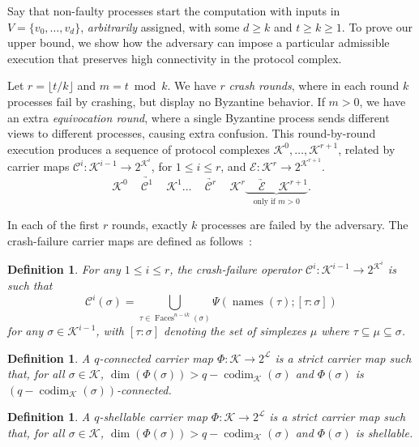 \documentclass[11pt]{article}
\newcommand{\cC}{\ensuremath{\mathcal{C}}}
\newcommand{\cE}{\ensuremath{\mathcal{E}}}
\newcommand{\cK}{\ensuremath{\mathcal{K}}}
\newcommand{\cL}{\ensuremath{\mathcal{L}}}
\DeclareMathOperator{\Faces}{Faces}
\DeclareMathOperator{\codim}{codim}
\DeclareMathOperator{\names}{names}\DeclareMathOperator{\name}{name}\DeclareMathOperator{\sgn}{sgn}
\newtheorem{definition}[theorem]{Definition}
\newcommand{\set}[1]{\{#1\}}
\newcommand{\runmap}[1]{{\, \underrightarrow{\quad {#1} \quad} \,}}
\newcommand{\piece}[2]{[{#1}:{#2}]}
\begin{document}
Say that non-faulty processes start the computation with inputs in $V = \set{v_0, \ldots, v_d}$,
\emph{arbitrarily} assigned,
with some $d \ge k$ and $t \ge k \ge 1$.
To prove our upper bound,
we show how the adversary can impose a particular admissible execution
that preserves high connectivity in the protocol complex.

Let $r = \lfloor t/k \rfloor$ and $m = t \bmod k$.
We have $r$ \emph{crash rounds},
where in each round $k$ processes fail by crashing, but display no Byzantine behavior.
If $m > 0$,
we have an extra \emph{equivocation round},
where a single Byzantine process
sends different views to different processes,
causing extra confusion.
This round-by-round execution produces a sequence of protocol complexes
$\cK^0, \ldots, \cK^{r+1}$,
related by carrier maps
$\cC^i: \cK^{i-1} \to 2^{\cK^i}$,
for $1 \le i \le r$,
and $\cE: \cK^r \to 2^{\cK^{r+1}}$.
\begin{equation}
\label{equation-setting}
\cK^0 \runmap{\cC^1} \cK^1 \ldots \runmap{\cC^r} \cK^r
\underbrace{\runmap{\cE} \cK^{r+1}}_{\textrm{only if $m > 0$}} \mathrm{.}
\end{equation}



In each of the first $r$ rounds,
exactly $k$ processes are failed by the adversary.
The crash-failure carrier maps are defined
as follows~\cite{ConcurrentShellable,MauriceBook}:

\begin{definition}
\label{definition-roundop-crash}
For any $1 \le i \le r$,
the crash-failure operator $\cC^i: \cK^{i-1} \to 2^{\cK^i}$ is such that
\begin{equation}
\label{eq-roundop-crash}
\cC^i(\sigma) = \bigcup_{\tau \in \Faces^{n-ik}(\sigma)}
		\Psi(\names(\tau); \piece{\tau}{\sigma})
\end{equation}
for any $\sigma \in \cK^{i-1}$,
with $\piece{\tau}{\sigma}$ denoting the set of simplexes $\mu$ where $\tau \subseteq \mu \subseteq \sigma$.
\end{definition}

\begin{definition}
\label{definition-mapconnected}
A \emph{$q$-connected} carrier map $\Phi: \cK \to 2^{\cL}$ is
a strict carrier map such that, for all $\sigma \in \cK$,
$\dim(\Phi(\sigma)) > q - \codim_{\cK}(\sigma)$
and
$\Phi(\sigma)$ is $(q - \codim_{\cK}(\sigma))$-connected.
\end{definition}

\begin{definition}
\label{definition-mapshellable}
A \emph{$q$-shellable} carrier map $\Phi: \cK \to 2^{\cL}$ is
a strict carrier map such that, for all $\sigma \in \cK$,
$\dim(\Phi(\sigma)) > q - \codim_{\cK}(\sigma)$
and
$\Phi(\sigma)$ is shellable.
\end{definition}
\end{document}
